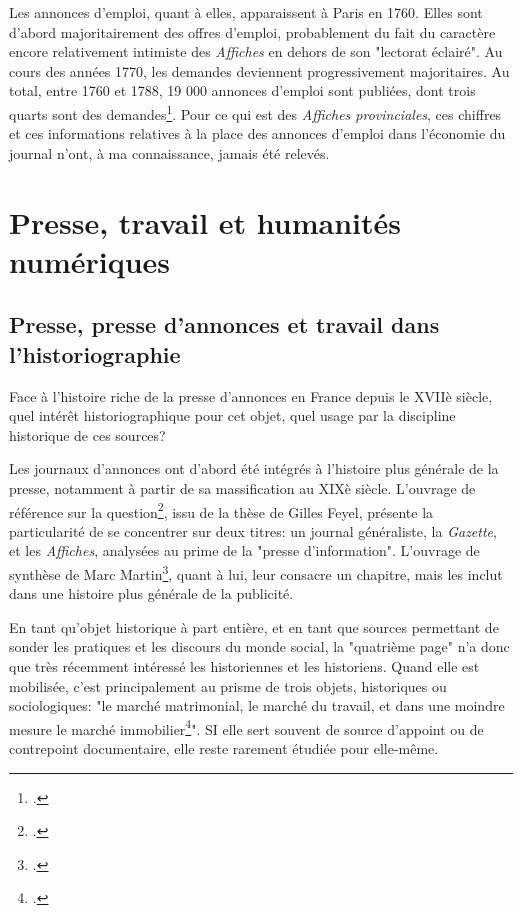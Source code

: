 Les annonces d'emploi, quant à elles, apparaissent à Paris en 1760. Elles sont d'abord majoritairement des offres d'emploi, probablement du fait du caractère encore relativement intimiste des \textit{Affiches} en dehors de son "lectorat éclairé". Au cours des années 1770, les demandes deviennent progressivement majoritaires. Au total, entre 1760 et 1788, 19 000 annonces d'emploi sont publiées, dont trois quarts sont des demandes\footcites{kramplPresseAnnoncesParisienne2020}. 
Pour ce qui est des \textit{Affiches provinciales}, ces chiffres et ces informations relatives à la place des annonces d'emploi dans l'économie du journal n'ont, à ma connaissance, jamais été relevés.


\section{Presse, travail et humanités numériques}

\subsection{Presse, presse d'annonces et travail dans l'historiographie}

Face à l'histoire riche de la presse d'annonces en France depuis le XVIIè siècle, quel intérêt historiographique pour cet objet, quel usage par la discipline historique de ces sources?

Les journaux d'annonces ont d'abord été intégrés à l'histoire plus générale de la presse, notamment à partir de sa massification au XIXè siècle. L'ouvrage de référence sur la question\footcites{feyelAnnonceNouvellePresse2000}, issu de la thèse de Gilles Feyel, présente la particularité de se concentrer sur deux titres: un journal généraliste, la \textit{Gazette}, et les \textit{Affiches}, analysées au prime de la "presse d'information". L'ouvrage de synthèse de Marc Martin\footcites{martinTroisSieclesPublicite1992}, quant à lui, leur consacre un chapitre, mais les inclut dans une histoire plus générale de la publicité.

En tant qu'objet historique à part entière, et en tant que sources permettant de sonder les pratiques et les discours du monde social, la "quatrième page" n'a donc que très récemment intéressé les historiennes et les historiens. Quand elle est mobilisée, c'est principalement au prisme de trois objets, historiques ou sociologiques:  "le marché matrimonial, le marché du travail, et dans une moindre mesure le marché immobilier\footcites{frydmanEcrireHistoirePetites2020}". SI elle sert souvent de source d'appoint ou de contrepoint documentaire, elle reste rarement étudiée pour elle-même.

